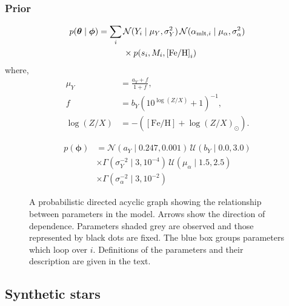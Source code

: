 \documentclass[fleqn,usenatbib]{mnras}
\newcommand{\eep}{\ensuremath{s}}
\newcommand{\feh}{\ensuremath{\mathrm{[Fe/H]}}}
\newcommand{\mlt}[1][]{{\ensuremath{\alpha_{\mathrm{mlt} \ifx#1\empty \else , #1 \fi}}}}
\newcommand{\normal}{\mathcal{N}}
\newcommand{\uniform}{\mathcal{U}}
\renewcommand*{\vec}[1]{\boldsymbol{#1}}
\begin{document}
\subsubsection{Prior}

\begin{equation}
    \begin{split}
        p(\vec{\theta} \mid \vec\phi) = \sum_i \, &\normal(Y_i \mid \mu_Y, \sigma_Y^2) \, \normal(\mlt[i] \mid \mu_\alpha, \sigma_\alpha^2) \\
        &\times p(\eep_i, M_i, \feh_i)
    \end{split}
\end{equation}
%
where,
%
\begin{align}
    \mu_Y &= \frac{a_Y + f}{1 + f}, \\
    f &= b_Y \left( 10^{\log({Z}/{X})} + 1 \right)^{-1}, \\
    \log({Z}/{X}) &= - \left(\feh + \log({Z}/{X})_\odot\right).
\end{align}
%

%
\begin{equation}
    \begin{split}
        p(\vec\phi) &= \normal(a_Y \mid 0.247, 0.001) \, \uniform(b_Y \mid 0.0, 3.0) \\
        &\times \Gamma(\sigma_Y^{-2} \mid 3, 10^{-4}) \, \uniform(\mu_\alpha \mid 1.5, 2.5) \\
        &\times \Gamma(\sigma_\alpha^{-2} \mid 3, 10^{-2})
    \end{split}
\end{equation}

\begin{figure}
    \centering
    
    \caption{A probabilistic directed acyclic graph showing the relationship between parameters in the model. Arrows show the direction of dependence.
    Parameters shaded grey are observed and those represented by black dots are fixed. 
    The blue box groups parameters which loop over \(i\). Definitions of the parameters and their description are given in the text.}
\end{figure}

\subsection{Synthetic stars}
\label{sec:synth}
\end{document}
